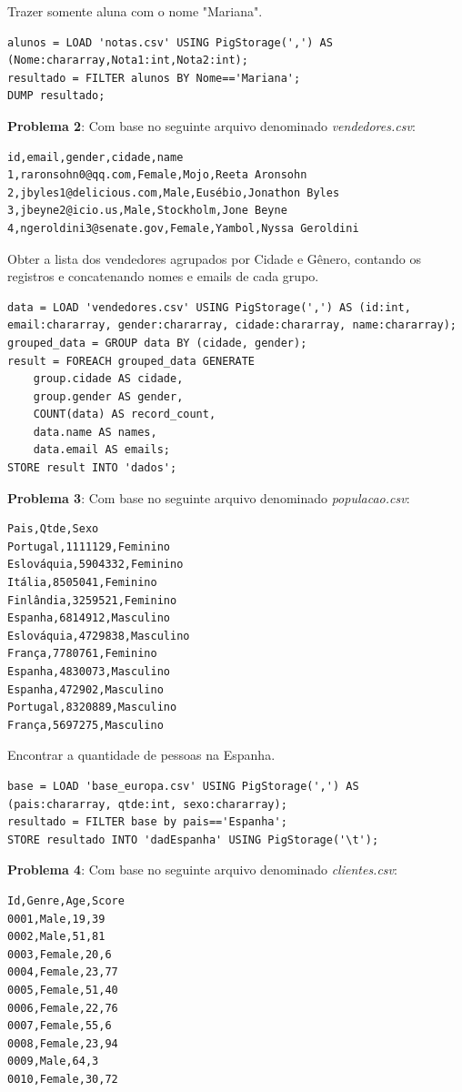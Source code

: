 \documentclass[a4paper,11pt]{article}
\begin{document}
Trazer somente  aluna com o nome "Mariana".
\begin{lstlisting}[]
alunos = LOAD 'notas.csv' USING PigStorage(',') AS (Nome:chararray,Nota1:int,Nota2:int);
resultado = FILTER alunos BY Nome=='Mariana';
DUMP resultado;
\end{lstlisting}

\textbf{Problema 2}: Com base no seguinte arquivo denominado \textit{vendedores.csv}:
\begin{lstlisting}[]
id,email,gender,cidade,name
1,raronsohn0@qq.com,Female,Mojo,Reeta Aronsohn
2,jbyles1@delicious.com,Male,Eusébio,Jonathon Byles
3,jbeyne2@icio.us,Male,Stockholm,Jone Beyne
4,ngeroldini3@senate.gov,Female,Yambol,Nyssa Geroldini
\end{lstlisting}

Obter a lista dos vendedores agrupados por Cidade e Gênero, contando os registros e concatenando nomes e emails de cada grupo.
\begin{lstlisting}[]
data = LOAD 'vendedores.csv' USING PigStorage(',') AS (id:int, email:chararray, gender:chararray, cidade:chararray, name:chararray);
grouped_data = GROUP data BY (cidade, gender);
result = FOREACH grouped_data GENERATE
    group.cidade AS cidade,
    group.gender AS gender,
    COUNT(data) AS record_count,
    data.name AS names,
    data.email AS emails;
STORE result INTO 'dados';
\end{lstlisting}

\textbf{Problema 3}: Com base no seguinte arquivo denominado \textit{populacao.csv}:
\begin{lstlisting}[]
Pais,Qtde,Sexo
Portugal,1111129,Feminino
Eslováquia,5904332,Feminino
Itália,8505041,Feminino
Finlândia,3259521,Feminino
Espanha,6814912,Masculino
Eslováquia,4729838,Masculino
França,7780761,Feminino
Espanha,4830073,Masculino
Espanha,472902,Masculino
Portugal,8320889,Masculino
França,5697275,Masculino
\end{lstlisting}

Encontrar a quantidade de pessoas na Espanha.
\begin{lstlisting}[]
base = LOAD 'base_europa.csv' USING PigStorage(',') AS (pais:chararray, qtde:int, sexo:chararray);
resultado = FILTER base by pais=='Espanha';
STORE resultado INTO 'dadEspanha' USING PigStorage('\t');
\end{lstlisting}

\textbf{Problema 4}: Com base no seguinte arquivo denominado \textit{clientes.csv}:
\begin{lstlisting}[]
Id,Genre,Age,Score
0001,Male,19,39
0002,Male,51,81
0003,Female,20,6
0004,Female,23,77
0005,Female,51,40
0006,Female,22,76
0007,Female,55,6
0008,Female,23,94
0009,Male,64,3
0010,Female,30,72
\end{lstlisting}
\end{document}
